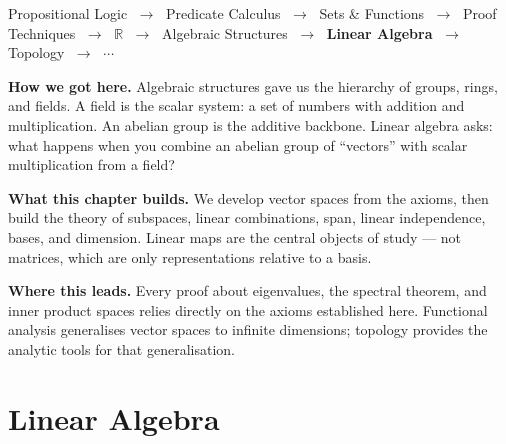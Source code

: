 \begin{tcolorbox}[
  colback=gray!6,
  colframe=gray!40,
  arc=2pt,
  left=8pt, right=8pt, top=6pt, bottom=6pt,
  title={\small\textbf{Where You Are in the Journey}},
  fonttitle=\small\bfseries
]
\begin{center}
\small
Propositional Logic
$\;\to\;$ Predicate Calculus
$\;\to\;$ Sets \& Functions
$\;\to\;$ Proof Techniques
$\;\to\;$ $\mathbb{R}$
$\;\to\;$ Algebraic Structures
$\;\to\;$ \textbf{Linear Algebra}
$\;\to\;$ Topology
$\;\to\;$ $\cdots$
\end{center}

\medskip
\noindent\textbf{How we got here.}
Algebraic structures gave us the hierarchy of groups, rings, and fields.
A field is the scalar system: a set of numbers with addition and
multiplication. An abelian group is the additive backbone.
Linear algebra asks: what happens when you combine an abelian group
of ``vectors'' with scalar multiplication from a field?

\medskip
\noindent\textbf{What this chapter builds.}
We develop vector spaces from the axioms, then build the theory of
subspaces, linear combinations, span, linear independence, bases,
and dimension. Linear maps are the central objects of study ---
not matrices, which are only representations relative to a basis.

\medskip
\noindent\textbf{Where this leads.}
Every proof about eigenvalues, the spectral theorem, and inner product
spaces relies directly on the axioms established here.
Functional analysis generalises vector spaces to infinite dimensions;
topology provides the analytic tools for that generalisation.
\end{tcolorbox}
\vspace{1em}


\section{Linear Algebra}




